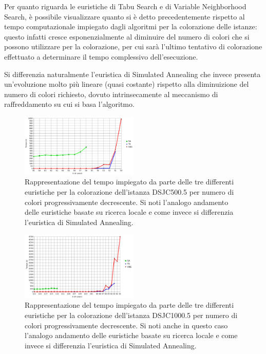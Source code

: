 \documentclass[a4paper,10pt]{article}
\begin{document}
Per quanto riguarda le euristiche di Tabu Search e di Variable Neighborhood Search, è possibile visualizzare quanto si è detto precedentemente rispetto al tempo computazionale impiegato dagli algoritmi per la colorazione delle istanze: questo infatti cresce esponenzialmente al diminuire del numero di colori che si possono utilizzare per la colorazione, per cui sarà l'ultimo tentativo di colorazione effettuato a determinare il tempo complessivo dell'esecuzione.

Si differenzia naturalmente l'euristica di Simulated Annealing che invece presenta un'evoluzione molto più lineare (quasi costante) rispetto alla diminuizione del numero di colori richiesto, dovuto intrinsecamente al meccanismo di raffreddamento su cui si basa l'algoritmo.

\begin{figure}[h]
\begin{center}
\includegraphics[width=0.5\textwidth,angle=-90]{img/500}
\caption[DSJC500: grafico colori-tempo]{Rappresentazione del tempo impiegato da parte delle tre differenti euristiche per la colorazione dell'istanza DSJC500.5 per numero di colori progressivamente decrescente. Si noti l'analogo andamento delle euristiche basate su ricerca locale e come invece si differenzia l'euristica di Simulated Annealing.}
\label{fig:500}
\end{center}
\end{figure}

\begin{figure}[h]
\begin{center}
\includegraphics[width=0.5\textwidth,angle=-90]{img/1000}
\caption[DSJC1000: grafico colori-tempo]{Rappresentazione del tempo impiegato da parte delle tre differenti euristiche per la colorazione dell'istanza DSJC1000.5 per numero di colori progressivamente decrescente. Si noti anche in questo caso l'analogo andamento delle euristiche basate su ricerca locale e come invece si differenzia l'euristica di Simulated Annealing.}
\label{fig:1000}
\end{center}
\end{figure}
\end{document}
